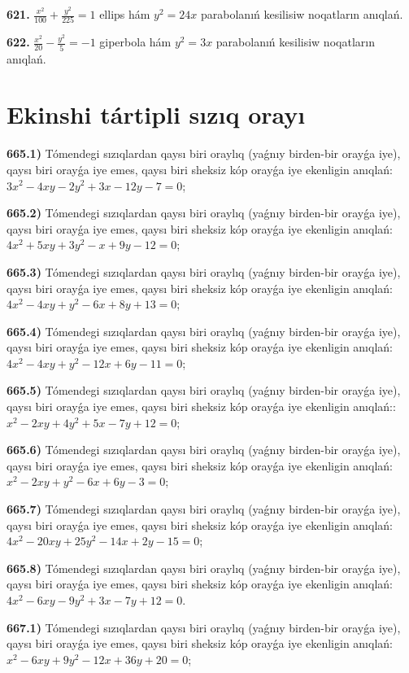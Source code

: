 \textbf{621.} $\frac{x^2}{100}+\frac{y^2}{225}=1$ ellips hám $y^2=24 x$ parabolanıń kesilisiw noqatların anıqlań.

\textbf{622.} $\frac{x^2}{20}-\frac{y^2}{5}=-1$ giperbola hám $y^2=3 x$ parabolanıń kesilisiw noqatların anıqlań.


\section{Ekinshi tártipli sızıq orayı}



\textbf{665.1) } Tómendegi sızıqlardan qaysı biri oraylıq (yaǵnıy birden-bir orayǵa iye), qaysı biri orayǵa iye emes, qaysı biri sheksiz kóp orayǵa iye ekenligin anıqlań: $3 x^2-4 x y-2 y^2+3 x-12 y-7=0$;

\textbf{665.2)} Tómendegi sızıqlardan qaysı biri oraylıq (yaǵnıy birden-bir orayǵa iye), qaysı biri orayǵa iye emes, qaysı biri sheksiz kóp orayǵa iye ekenligin anıqlań: $4 x^2+5 x y+3 y^2-x+9 y-12=0$;

\textbf{665.3)} Tómendegi sızıqlardan qaysı biri oraylıq (yaǵnıy birden-bir orayǵa iye), qaysı biri orayǵa iye emes, qaysı biri sheksiz kóp orayǵa iye ekenligin anıqlań: $4 x^2-4 x y+y^2-6 x+8 y+13=0$;

\textbf{665.4)} Tómendegi sızıqlardan qaysı biri oraylıq (yaǵnıy birden-bir orayǵa iye), qaysı biri orayǵa iye emes, qaysı biri sheksiz kóp orayǵa iye ekenligin anıqlań: $4 x^2-4 x y+y^2-12 x+6 y-11=0$;

\textbf{665.5)} Tómendegi sızıqlardan qaysı biri oraylıq (yaǵnıy birden-bir orayǵa iye), qaysı biri orayǵa iye emes, qaysı biri sheksiz kóp orayǵa iye ekenligin anıqlań:: $x^2-2 x y+4 y^2+5 x-7 y+12=0$;

\textbf{665.6)} Tómendegi sızıqlardan qaysı biri oraylıq (yaǵnıy birden-bir orayǵa iye), qaysı biri orayǵa iye emes, qaysı biri sheksiz kóp orayǵa iye ekenligin anıqlań:  $x^2-2 x y+y^2-6 x+6 y-3=0$;

\textbf{665.7)} Tómendegi sızıqlardan qaysı biri oraylıq (yaǵnıy birden-bir orayǵa iye), qaysı biri orayǵa iye emes, qaysı biri sheksiz kóp orayǵa iye ekenligin anıqlań: $4 x^2-20 x y+25 y^2-14 x+2 y-15=0$;

\textbf{665.8)} Tómendegi sızıqlardan qaysı biri oraylıq (yaǵnıy birden-bir orayǵa iye), qaysı biri orayǵa iye emes, qaysı biri sheksiz kóp orayǵa iye ekenligin anıqlań:  $4 x^2-6 x y-9 y^2+3 x-7 y+12=0$.

\textbf{667.1)} Tómendegi sızıqlardan qaysı biri oraylıq (yaǵnıy birden-bir orayǵa iye), qaysı biri orayǵa iye emes, qaysı biri sheksiz kóp orayǵa iye ekenligin anıqlań: $x^2-6 x y+9 y^2-12 x+36 y+20=0$;

